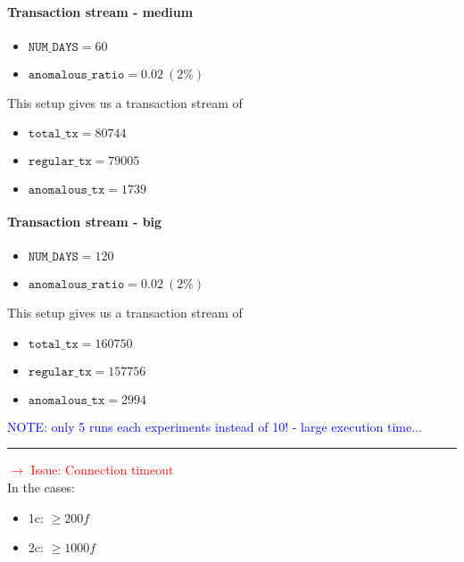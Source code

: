 \paragraph{Transaction stream - medium\\}

\begin{itemize}
  \item $\texttt{NUM\_DAYS} = 60$
  \item $\texttt{anomalous\_ratio} = 0.02\ (2\%)$ 
\end{itemize}

This setup gives us a transaction stream of 
\begin{itemize}
  \item $\texttt{total\_tx} = 80744$
  \item $\texttt{regular\_tx} = 79005$
  \item $\texttt{anomalous\_tx} = 1739$
\end{itemize}

\paragraph{Transaction stream - big\\}

\begin{itemize}
  \item $\texttt{NUM\_DAYS} = 120$
  \item $\texttt{anomalous\_ratio} = 0.02\ (2\%)$ 
\end{itemize}

This setup gives us a transaction stream of 
\begin{itemize}
  \item $\texttt{total\_tx} = 160750$
  \item $\texttt{regular\_tx} = 157756$
  \item $\texttt{anomalous\_tx} = 2994$
\end{itemize}

\textcolor{blue}{NOTE: only 5 runs each experiments instead of 10! - large execution time...}

\rule{\textwidth}{0.4pt} 
\textcolor{red}{$\rightarrow$ Issue: Connection timeout\\}
In the cases: 
\begin{itemize}
    \item 1c: $\ge 200f$
    \item 2c: $\ge 1000f$
\end{itemize}

